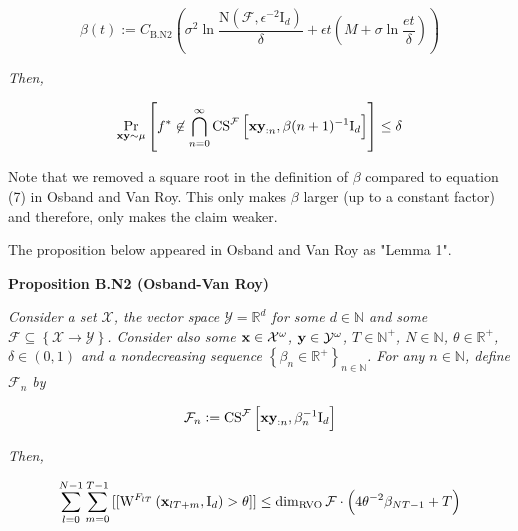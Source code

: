 \documentclass[a4paper]{article}
\newcommand{\Co}[1]{}
\newcommand{\AP}[1]{\left(#1\right)}
\newcommand{\AB}[1]{\left[#1\right]}
\newcommand{\AC}[1]{\left\{#1\right\}}
\newcommand{\Pa}[2]{\underset{#1}{\operatorname{Pr}}\AB{#2}}
\newcommand{\Nats}{\mathbb{N}}
\newcommand{\Reals}{\mathbb{R}}
\newcommand{\Id}{\mathrm{I}}
\newcommand{\X}{\mathcal{X}}
\newcommand{\Y}{\mathcal{Y}}
\newcommand{\F}{\mathcal{F}}
\DeclareMathOperator{\RVO}{\dim_{RVO}}
\newcommand{\N}{\mathrm{N}}
\newcommand{\CS}{\mathrm{CS}}
\newcommand{\W}{\mathrm{W}}
\begin{document}
$$\beta(t):=C_{\mathrm{B.N2}}\AP{\sigma^2 \ln{\frac{\N\AP{\F,\epsilon^{-2}\Id_d}}{\delta}}+\epsilon t\AP{M+\sigma\ln{\frac{et}{\delta}}}}$$

\textit{Then,}\Co{i}

$$\Pa{\bold{xy}\sim\mu}{f^*\not\in\bigcap_{n=0}^\infty\CS^\F\AB{\bold{xy}_{:n},\beta(n+1)^{-1}\Id_d}} \leq \delta$$

Note that we removed a square root in the definition of $\beta$ compared to equation (7) in Osband and Van Roy. This only makes $\beta$ larger (up to a constant factor) and therefore, only makes the claim weaker.

The proposition below appeared in Osband and Van Roy as "Lemma 1".

\textbf{Proposition B.N2 (Osband-Van Roy)}\Co{b}

\textit{Consider a set $\X$, the vector space $\Y=\Reals^d$ for some $d\in\Nats$ and some $\F\subseteq\AC{\X\rightarrow\Y}$. Consider also some $\bold{x}\in\X^\omega$, $\bold{y}\in\Y^\omega$, $T\in\Nats^+$, $N\in\Nats$, $\theta\in\Reals^+$, $\delta\in(0,1)$ and a nondecreasing sequence $\AC{\beta_n\in\Reals^+}_{n\in\Nats}$. For any $n\in\Nats$, define $\F_n$ by}\Co{i}

$$\F_n:=\CS^\F\AB{\bold{xy}_{:n},\beta_n^{-1}\Id_d}$$

\textit{Then,}\Co{i}

$$\sum_{l=0}^{N-1}\sum_{m=0}^{T-1}{[[\W^{F_{lT}}\AP{\bold{x}_{lT+m},\Id_d}>\theta]]} \leq \RVO{\F}\cdot\AP{4\theta^{-2}\beta_{NT-1}+T}$$
\end{document}
